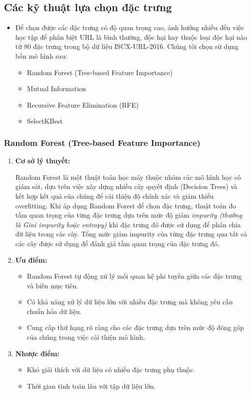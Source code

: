 \documentclass[13pt]{article}
\begin{document}
\subsection{Các kỹ thuật lựa chọn đặc trưng}
\begin{itemize}
    \item Để chọn được các đặc trưng có độ quan trọng cao, ảnh hưởng nhiều đến việc học tập để phân biệt URL là bình thường, độc hại hay thuộc loại độc hại nào từ 80 đặc trưng trong bộ dữ liệu ISCX-URL-2016. Chúng tôi chọn sử dụng bốn mô hình sau: 
    \begin{itemize}
        \item Random Forest (Tree-based Feature Importance)
        \item Mutual Information
        \item Recursive Feature Elimination (RFE)
        \item SelectKBest
    \end{itemize}
\end{itemize}

\subsubsection{Random Forest (Tree-based Feature Importance)}
\begin{enumerate}
    \item \textbf{Cơ sở lý thuyết: }
    
    Random Forest là một thuật toán học máy thuộc nhóm các mô hình học có giám sát, dựa trên việc xây dựng nhiều cây quyết định (Decision Trees) và kết hợp kết quả của chúng để cải thiện độ chính xác và giảm thiểu overfitting. Khi áp dụng Random Forest để chọn đặc trưng, thuật toán đo tầm quan trọng của từng đặc trưng dựa trên mức độ giảm \textit{impurity (thường là Gini impurity hoặc entropy)} khi đặc trưng đó được sử dụng để phân chia dữ liệu trong các cây. Tổng mức giảm impurity của từng đặc trưng qua tất cả các cây được sử dụng để đánh giá tầm quan trọng của đặc trưng đó.
    \item \textbf{Ưu điểm: }
    \begin{itemize}
        \item Random Forest tự động xử lý mối quan hệ phi tuyến giữa các đặc trưng và biến mục tiêu.
        \item Có khả năng xử lý dữ liệu lớn với nhiều đặc trưng mà không yêu cầu chuẩn hóa dữ liệu.
        \item Cung cấp thứ hạng rõ ràng cho các đặc trưng dựa trên mức độ đóng góp của chúng trong việc cải thiện mô hình.
    \end{itemize}
    \item \textbf{Nhược điểm: }
    \begin{itemize}
        \item Khó giải thích với dữ liệu có nhiều đặc trưng phụ thuộc.
        \item Thời gian tính toán lâu với tập dữ liệu lớn.
    \end{itemize}
\end{enumerate}
\end{document}
